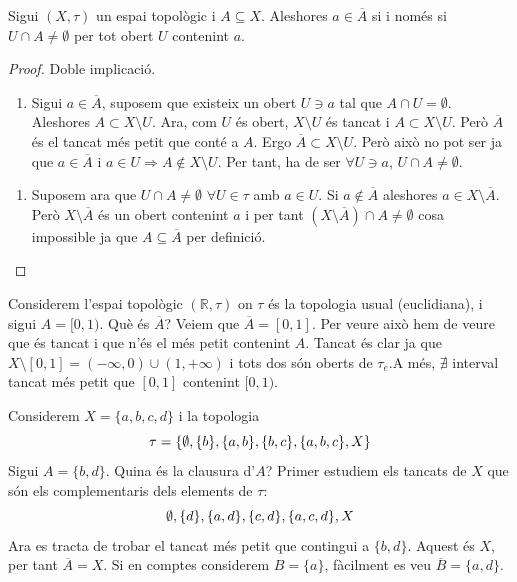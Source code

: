 \documentclass[../main.tex]{subfiles}
\begin{document}
\begin{prop}
\label{prop:clausura3} Sigui $(X,\tau)$ un espai topològic i $A\subseteq X$. Aleshores $a\in \overline{A}$ si i només si $U\cap A\not=\emptyset$ per tot obert $U$ contenint $a$.
\end{prop}
\begin{proof}
Doble implicació.
\begin{enumerate}[($\Rightarrow$)]
    \item Sigui $a\in \overline{A}$, suposem que existeix un obert $U\ni a$ tal que $A\cap U=\emptyset$. Aleshores $A\subset X\setminus U$. Ara, com $U$ és obert, $X\setminus U$ és tancat i $A\subset X\setminus U$. Però $\overline{A}$ és el tancat més petit que conté a $A$. Ergo $\overline{A}\subset X\setminus U$. Però això no pot ser ja que $a\in \overline{A}$ i $a\in U\Rightarrow A\not\in X\setminus U$. Per tant, ha de ser $\forall U\ni a$, $U\cap A\not=\emptyset$.
\end{enumerate}
\begin{enumerate}[($\Leftarrow$)]
    \item Suposem ara que $U\cap A\not=\emptyset$ $\forall U\in\tau$ amb $a\in U$. Si $a\not\in\overline{A}$ aleshores $a\in X\setminus \overline{A}$. Però $X\setminus \overline{A}$ és un obert contenint $a$ i per tant $(X\setminus \overline{A})\cap A\not=\emptyset$ cosa impossible ja que $A\subseteq\overline{A}$ per definició.
\end{enumerate}
\end{proof}

\begin{ej}
\label{ej:clausura1} Considerem l'espai topològic $(\mathbb{R},\tau)$ on $\tau$ és la topologia usual (euclidiana), i sigui $A=[0,1)$. Què és $\overline{A}$? Veiem que $\overline{A} = [0,1]$. Per veure això hem de veure que és tancat i que n'és el més petit contenint $A$. Tancat és clar ja que $X\setminus[0,1] = (-\infty,0)\cup(1,+\infty)$ i tots dos són oberts de $\tau_e$.A més, $\nexists$ interval tancat més petit que $[0,1]$ contenint $[0,1)$.
\end{ej}

\begin{ej}
\label{ej:clausura2} Considerem $X = \{a,b,c,d\}$ i la topologia
\begin{equation}
    \notag
    \tau = \{\emptyset,\{b\},\{a,b\},\{b,c\},\{a,b,c\},X\}
\end{equation}
Sigui $A = \{b,d\}$. Quina és la clausura d'$A$? Primer estudiem els tancats de $X$ que són els complementaris dels elements de $\tau$:
\begin{equation}
    \notag
    \emptyset,\{d\},\{a,d\},\{c,d\},\{a,c,d\}, X
\end{equation}
Ara es tracta de trobar el tancat més petit que contingui a $\{b,d\}$. Aquest és $X$, per tant $\overline{A} = X$. Si en comptes considerem $B = \{a\}$, fàcilment es veu $\overline{B} = \{a,d\}$.
\end{ej}
\end{document}
